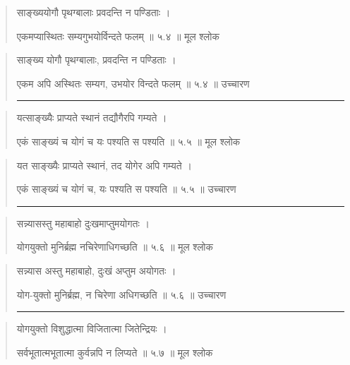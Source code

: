 \begin{quotation}  

साङ्‍ख्ययोगौ पृथग्बालाः प्रवदन्ति न पण्डिताः  ।  

एकमप्यास्थितः सम्यगुभयोर्विन्दते फलम्‌  ॥ ५.४ ॥  मूल श्लोक
\end{quotation}

\begin{quotation}

साङ्‍ख्य योगौ पृथग्बालाः, प्रवदन्ति न पण्डिताः  ।  

एकम अपि अस्थितः सम्यग, उभयोर विन्दते फलम्‌  ॥ ५.४ ॥  उच्चारण

\noindent\rule{16cm}{0.4pt} 
\end{quotation}


\begin{quotation}  

यत्साङ्‍ख्यैः प्राप्यते स्थानं तद्यौगैरपि गम्यते  ।  

एकं साङ्‍ख्यं च योगं च यः पश्यति स पश्यति  ॥ ५.५ ॥  मूल श्लोक
\end{quotation}

\begin{quotation}

यत साङ्‍ख्यैः प्राप्यते स्थानं, तद योगेर अपि गम्यते  ।  

एकं साङ्‍ख्यं च योगं च, यः पश्यति स पश्यति  ॥ ५.५ ॥  उच्चारण

\noindent\rule{16cm}{0.4pt} 
\end{quotation}


\begin{quotation}  

सन्न्यासस्तु महाबाहो दुःखमाप्तुमयोगतः  ।  

योगयुक्तो मुनिर्ब्रह्म नचिरेणाधिगच्छति  ॥ ५.६ ॥  मूल श्लोक
\end{quotation}

\begin{quotation}

सन्न्यास अस्तु महाबाहो, दुःखं अप्तुम अयोगतः  ।  

योग-युक्तो मुनिर्ब्रह्म, न चिरेणा अधिगच्छति  ॥ ५.६ ॥  उच्चारण

\noindent\rule{16cm}{0.4pt} 
\end{quotation}


\begin{quotation}  

योगयुक्तो विशुद्धात्मा विजितात्मा जितेन्द्रियः  ।  

सर्वभूतात्मभूतात्मा कुर्वन्नपि न लिप्यते  ॥ ५.७ ॥  मूल श्लोक
\end{quotation}

